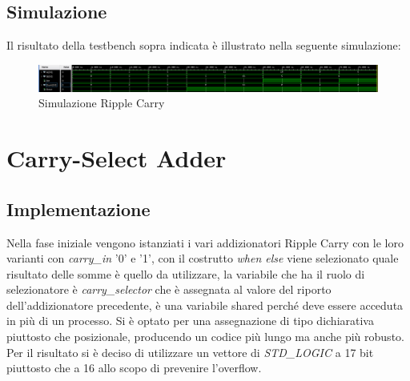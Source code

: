 \subsection{Simulazione}
Il risultato della testbench sopra indicata è illustrato nella seguente simulazione:
\begin{figure}[h]
    \centering
    \includegraphics[width=16cm]{resources/ripple_carry_sim.png}
    \caption{Simulazione Ripple Carry}
    \label{fig:simulation_ripple_carry}
\end{figure}



\newpage

\section{Carry-Select Adder}
\subsection{Implementazione}
Nella fase iniziale vengono istanziati i vari addizionatori Ripple Carry con le loro varianti con \textit{carry\_in} '0' e '1', con il costrutto \textit{when else} viene selezionato quale risultato delle somme è quello da utilizzare, la variabile che ha il ruolo di selezionatore è \textit{carry\_selector} che è assegnata al valore del riporto dell'addizionatore precedente, è una variabile shared perché deve essere acceduta in più di un processo. Si è optato per una assegnazione di tipo dichiarativa piuttosto che posizionale, producendo un codice più lungo ma anche più robusto.
Per il risultato si è deciso di utilizzare un vettore di \textit{STD\_LOGIC} a 17 bit piuttosto che a 16 allo scopo di prevenire l'overflow.

